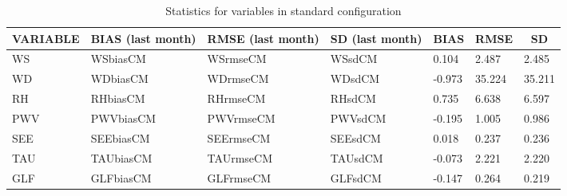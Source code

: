 \documentclass[11pt,english]{article}
\begin{document}
\clearpage
\begin{table}[]
\begin{center}
\begin{tabular}{|l|l|l|l|l|l|l|}
\hline
\multicolumn{1}{|c|}{\cellcolor[HTML]{C0C0C0}\textbf{VARIABLE}} & \multicolumn{1}{c|}{\cellcolor[HTML]{C0C0C0}\textbf{BIAS} (last month)} & \multicolumn{1}{c|}{\cellcolor[HTML]{C0C0C0}\textbf{RMSE} (last month)} & \multicolumn{1}{c|}{\cellcolor[HTML]{C0C0C0}\textbf{SD} (last month)} & \multicolumn{1}{c|}{\cellcolor[HTML]{C0C0C0}\textbf{BIAS}} & \multicolumn{1}{c|}{\cellcolor[HTML]{C0C0C0}\textbf{RMSE}} & \multicolumn{1}{c|}{\cellcolor[HTML]{C0C0C0}\textbf{SD}}\\\hline
\cellcolor[HTML]{C0C0C0}WS  & WSbiasCM     & WSrmseCM     & WSsdCM  &     0.104  &     2.487  &     2.485 \\
\cellcolor[HTML]{C0C0C0}WD  & WDbiasCM     & WDrmseCM     & WDsdCM  &    -0.973  &    35.224  &    35.211 \\
\cellcolor[HTML]{C0C0C0}RH  & RHbiasCM     & RHrmseCM     & RHsdCM  &     0.735  &     6.638  &     6.597 \\
\cellcolor[HTML]{C0C0C0}PWV & PWVbiasCM    & PWVrmseCM    & PWVsdCM &    -0.195 &     1.005 &     0.986 \\
\cellcolor[HTML]{C0C0C0}SEE & SEEbiasCM    & SEErmseCM    & SEEsdCM &     0.018 &     0.237 &     0.236 \\
\cellcolor[HTML]{C0C0C0}TAU & TAUbiasCM    & TAUrmseCM    & TAUsdCM &    -0.073 &     2.221 &     2.220 \\
\cellcolor[HTML]{C0C0C0}GLF & GLFbiasCM    & GLFrmseCM    & GLFsdCM &    -0.147 &     0.264 &     0.219 \\
\hline
\end{tabular}
\caption{Statistics for variables in standard configuration}
\end{center}
\end{table}
\end{document}
